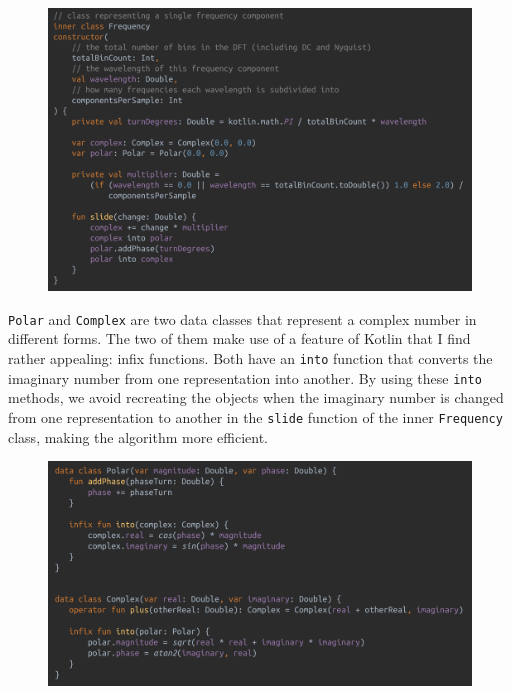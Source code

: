 \documentclass[11pt,twoside,a4paper]{report}
\begin{document}
\begin{figure}[h!]
  \centering
  \includegraphics[width=1.0\textwidth]{code-innerClassFrequency.png}
  \caption{}
  \label{fig:innerClassFrequency}
\end{figure}

\texttt{Polar} and \texttt{Complex} are two data classes that represent a complex number in different forms. The two of them make use of a feature of Kotlin that I find rather appealing: infix functions. Both have an \texttt{into} function that converts the imaginary number from one representation into another. By using these \texttt{into} methods, we avoid recreating the objects when the imaginary number is changed from one representation to another in the \texttt{slide} function of the inner \texttt{Frequency} class, making the algorithm more efficient.

\begin{figure}[h!]
  \centering
  \includegraphics[width=1.0\textwidth]{code-SDFT-complex-polar.png}
  \caption{}
  \label{fig:complexPolar}
\end{figure}
\end{document}
